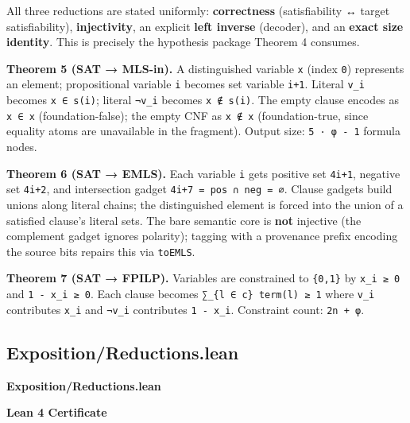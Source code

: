 \documentclass[11pt,a4paper]{article}
\begin{document}
All three reductions are stated uniformly: \textbf{correctness} (satisfiability ↔ target satisfiability), \textbf{injectivity}, an explicit \textbf{left inverse} (decoder), and an \textbf{exact size identity}. This is precisely the hypothesis package Theorem 4 consumes.

\textbf{Theorem 5 (SAT → MLS-in).} A distinguished variable \texttt{x} (index \texttt{0}) represents an element; propositional variable \texttt{i} becomes set variable \texttt{i+1}. Literal \texttt{v\_i} becomes \texttt{x\ ∈\ s(i)}; literal \texttt{¬v\_i} becomes \texttt{x\ ∉\ s(i)}. The empty clause encodes as \texttt{x\ ∈\ x} (foundation-false); the empty CNF as \texttt{x\ ∉\ x} (foundation-true, since equality atoms are unavailable in the fragment). Output size: \texttt{5\ ·\ \textbar{}φ\textbar{}\ -\ 1} formula nodes.

\textbf{Theorem 6 (SAT → EMLS).} Each variable \texttt{i} gets positive set \texttt{4i+1}, negative set \texttt{4i+2}, and intersection gadget \texttt{4i+7\ =\ pos\ ∩\ neg\ =\ ∅}. Clause gadgets build unions along literal chains; the distinguished element is forced into the union of a satisfied clause's literal sets. The bare semantic core is \textbf{not} injective (the complement gadget ignores polarity); tagging with a provenance prefix encoding the source bits repairs this via \texttt{toEMLS}.

\textbf{Theorem 7 (SAT → FPILP).} Variables are constrained to \texttt{\{0,1\}} by \texttt{x\_i\ ≥\ 0} and \texttt{1\ -\ x\_i\ ≥\ 0}. Each clause becomes \texttt{∑\_\{l\ ∈\ c\}\ term(l)\ ≥\ 1} where \texttt{v\_i} contributes \texttt{x\_i} and \texttt{¬v\_i} contributes \texttt{1\ -\ x\_i}. Constraint count: \texttt{2n\ +\ \textbar{}φ\textbar{}}.

\hypertarget{exposition-reductions-lean}{%
\subsection{Exposition/Reductions.lean}\label{exposition-reductions-lean}}

\noindent\textbf{Exposition/Reductions.lean}

\vspace{0.75\baselineskip}
\noindent\textcolor{green!40!black}{\textbf{Lean 4 Certificate}}\par\vspace{0.25\baselineskip}

\vspace{0.75\baselineskip}
\end{document}
